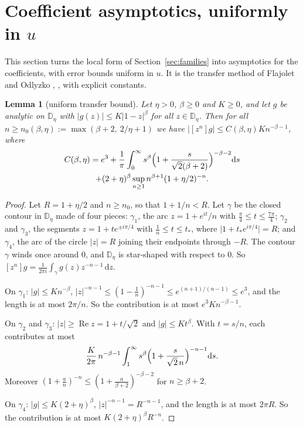 \documentclass[11pt]{amsart}
\newtheorem{lemma}[theorem]{Lemma}
\theoremstyle{definition}
\theoremstyle{remark}
\numberwithin{equation}{section}
\DeclareMathOperator{\re}{Re}
\newcommand{\DD}{\mathbb{D}}
\newcommand{\abs}[1]{\lvert #1\rvert}
\newcommand{\dd}{\mathrm{d}}
\begin{document}
\section{Coefficient asymptotics, uniformly in \texorpdfstring{\(u\)}{u}}\label{sec:asym}

This section turns the local form of Section~\ref{sec:families} into asymptotics for the coefficients, with error bounds uniform in \(u\). It is the transfer method of Flajolet and Odlyzko \cite{FO}, \cite[Ch.~VI]{FS}, with explicit constants.

\begin{lemma}[uniform transfer bound]\label{lem:transfer}
Let \(\eta>0\), \(\beta\ge0\) and \(K\ge0\), and let \(g\) be analytic on \(\DD_\eta\) with \(\abs{g(z)}\le K\abs{1-z}^\beta\) for all \(z\in\DD_\eta\). Then for all \(n\ge n_0(\beta,\eta):=\max(\beta+2,\ 2/\eta+1)\) we have \(\abs{[z^n]g}\le C(\beta,\eta)Kn^{-\beta-1}\), where
\begin{multline*}
C(\beta,\eta)=e^3+\frac1\pi\int_0^\infty s^\beta\Bigl(1+\frac{s}{\sqrt2(\beta+2)}\Bigr)^{-\beta-2}\dd s\\
+(2+\eta)^\beta\sup_{n\ge1}n^{\beta+1}(1+\eta/2)^{-n} .
\end{multline*}
\end{lemma}

\begin{proof}
Let \(R=1+\eta/2\) and \(n\ge n_0\), so that \(1+1/n<R\). Let \(\gamma\) be the closed contour in \(\DD_\eta\) made of four pieces: \(\gamma_1\), the arc \(z=1+e^{it}/n\) with \(\frac\pi4\le t\le\frac{7\pi}4\); \(\gamma_2\) and \(\gamma_3\), the segments \(z=1+te^{\pm i\pi/4}\) with \(\frac1n\le t\le t_\ast\), where \(\abs{1+t_\ast e^{i\pi/4}}=R\); and \(\gamma_4\), the arc of the circle \(\abs{z}=R\) joining their endpoints through \(-R\). The contour \(\gamma\) winds once around \(0\), and \(\DD_\eta\) is star-shaped with respect to \(0\). So \([z^n]g=\frac1{2\pi i}\int_\gamma g(z)z^{-n-1}\,\dd z\).

On \(\gamma_1\): \(\abs{g}\le Kn^{-\beta}\), \(\abs{z}^{-n-1}\le(1-\frac1n)^{-n-1}\le e^{(n+1)/(n-1)}\le e^3\), and the length is at most \(2\pi/n\). So the contribution is at most \(e^3Kn^{-\beta-1}\).

On \(\gamma_2\) and \(\gamma_3\): \(\abs{z}\ge\re z=1+t/\sqrt2\) and \(\abs{g}\le Kt^\beta\). With \(t=s/n\), each contributes at most
\[
\frac{K}{2\pi}\,n^{-\beta-1}\int_1^\infty s^\beta\Bigl(1+\frac{s}{\sqrt2\,n}\Bigr)^{-n-1}\dd s .
\]
Moreover \((1+\frac an)^{-n}\le(1+\frac a{\beta+2})^{-\beta-2}\) for \(n\ge\beta+2\).

On \(\gamma_4\): \(\abs{g}\le K(2+\eta)^\beta\), \(\abs{z}^{-n-1}=R^{-n-1}\), and the length is at most \(2\pi R\). So the contribution is at most \(K(2+\eta)^\beta R^{-n}\).
\end{proof}
\end{document}
